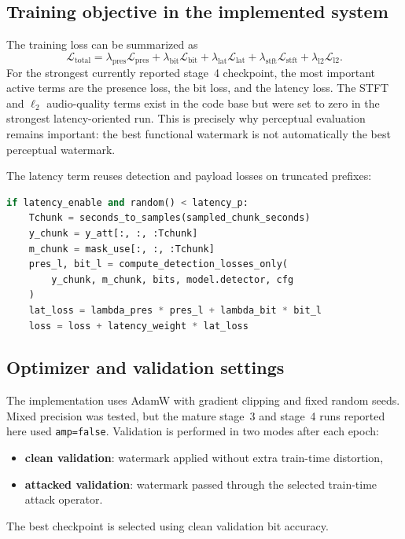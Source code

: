 \subsection{Training objective in the implemented system}
The training loss can be summarized as
\begin{equation}
  \mathcal{L}_{\mathrm{total}} = \lambda_{\mathrm{pres}}\mathcal{L}_{\mathrm{pres}} +
  \lambda_{\mathrm{bit}}\mathcal{L}_{\mathrm{bit}} +
  \lambda_{\mathrm{lat}}\mathcal{L}_{\mathrm{lat}} +
  \lambda_{\mathrm{stft}}\mathcal{L}_{\mathrm{stft}} +
  \lambda_{\mathrm{l2}}\mathcal{L}_{\mathrm{l2}}.
\end{equation}
For the strongest currently reported stage~4 checkpoint, the most important active terms are the presence loss, the bit loss, and the latency loss. The STFT and $\ell_2$ audio-quality terms exist in the code base but were set to zero in the strongest latency-oriented run. This is precisely why perceptual evaluation remains important: the best functional watermark is not automatically the best perceptual watermark.

The latency term reuses detection and payload losses on truncated prefixes:
\begin{lstlisting}[language=Python,caption={Latency auxiliary loss used during stage 4 fine-tuning.},label={lst:latency_loss}]
if latency_enable and random() < latency_p:
    Tchunk = seconds_to_samples(sampled_chunk_seconds)
    y_chunk = y_att[:, :, :Tchunk]
    m_chunk = mask_use[:, :, :Tchunk]
    pres_l, bit_l = compute_detection_losses_only(
        y_chunk, m_chunk, bits, model.detector, cfg
    )
    lat_loss = lambda_pres * pres_l + lambda_bit * bit_l
    loss = loss + latency_weight * lat_loss
\end{lstlisting}

\subsection{Optimizer and validation settings}
The implementation uses AdamW with gradient clipping and fixed random seeds. Mixed precision was tested, but the mature stage~3 and stage~4 runs reported here used \texttt{amp=false}. Validation is performed in two modes after each epoch:
\begin{itemize}[leftmargin=1.25em]
  \item \textbf{clean validation}: watermark applied without extra train-time distortion,
  \item \textbf{attacked validation}: watermark passed through the selected train-time attack operator.
\end{itemize}
The best checkpoint is selected using clean validation bit accuracy.

